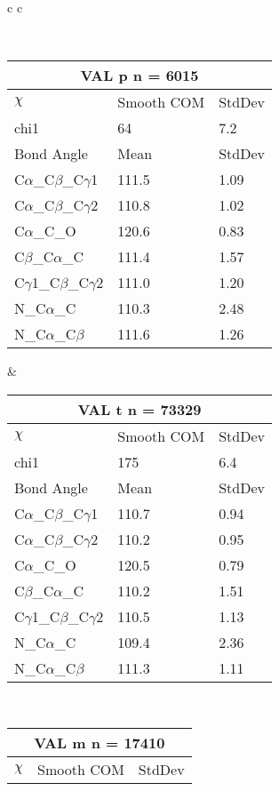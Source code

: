 \begin{longtable}{ c c }

\caption{VAL Central Values}\\
  \begin{tabular}{ l l l }
  \toprule
  \multicolumn{3}{c}{VAL \textbf{p} n = 6015} \\ \toprule
  $\chi$       & Smooth COM & StdDev \\ \midrule
  chi1 & 64 & 7.2 \\ \midrule
  Bond Angle   & Mean     & StdDev \\ \midrule
  C$\alpha$\_C$\beta$\_C$\gamma$1 & 111.5 & 1.09\\
  C$\alpha$\_C$\beta$\_C$\gamma$2 & 110.8 & 1.02\\
  C$\alpha$\_C\_O & 120.6 & 0.83\\
  C$\beta$\_C$\alpha$\_C & 111.4 & 1.57\\
  C$\gamma$1\_C$\beta$\_C$\gamma$2 & 111.0 & 1.20\\
  N\_C$\alpha$\_C & 110.3 & 2.48\\
  N\_C$\alpha$\_C$\beta$ & 111.6 & 1.26\\
  \bottomrule
  \end{tabular}
  &
  \begin{tabular}{ l l l }
  \toprule
  \multicolumn{3}{c}{VAL \textbf{t} n = 73329} \\ \toprule
  $\chi$       & Smooth COM & StdDev \\ \midrule
  chi1 & 175 & 6.4 \\ \midrule
  Bond Angle   & Mean     & StdDev \\ \midrule
  C$\alpha$\_C$\beta$\_C$\gamma$1 & 110.7 & 0.94\\
  C$\alpha$\_C$\beta$\_C$\gamma$2 & 110.2 & 0.95\\
  C$\alpha$\_C\_O & 120.5 & 0.79\\
  C$\beta$\_C$\alpha$\_C & 110.2 & 1.51\\
  C$\gamma$1\_C$\beta$\_C$\gamma$2 & 110.5 & 1.13\\
  N\_C$\alpha$\_C & 109.4 & 2.36\\
  N\_C$\alpha$\_C$\beta$ & 111.3 & 1.11\\
  \bottomrule
  \end{tabular}
  \\
  \begin{tabular}{ l l l }
  \toprule
  \multicolumn{3}{c}{VAL \textbf{m} n = 17410} \\ \toprule
  $\chi$       & Smooth COM & StdDev \\ \midrule

\end{tabular}
\end{longtable}
